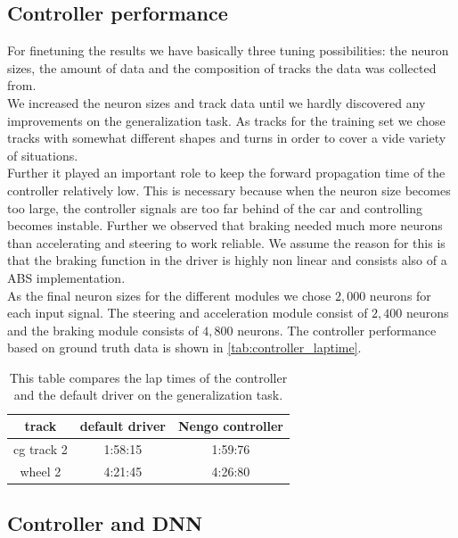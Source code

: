 \documentclass[10pt,a4paper,twoside,journal]{IEEEtran}
\begin{document}
\subsection{Controller performance}
For finetuning the results we have basically three tuning possibilities: the neuron sizes, the amount of data and the composition of tracks the data was collected from. \\
We increased the neuron sizes and track data until we hardly discovered any improvements on the generalization task. As tracks for the training set we chose tracks with somewhat different shapes and turns in order to cover a vide variety of situations. \\
Further it played an important role to keep the forward propagation time of the controller relatively low. This is necessary because when the neuron size becomes too large, the controller signals are too far behind of the car and controlling becomes instable. Further we observed that braking needed much more neurons than accelerating and steering to work reliable. We assume the reason for this is that the braking function in the driver is highly non linear and consists also of a ABS implementation. \\
As the final neuron sizes for the different modules we chose $2,000$ neurons for each input signal. The steering and acceleration module consist of $2,400$ neurons and the braking module consists of $4,800$ neurons. The controller performance based on ground truth data is shown in \autoref{tab:controller_laptime}.

\begin{table}[ht]
	\begin{center}
		\begin{tabular}{ |c|c|c| } 
			\hline
			track &  default driver & Nengo controller\\
			\hline
			cg track 2  & 1:58:15 & 1:59:76  \\
			wheel 2 & 4:21:45 & 4:26:80 \\
			\hline
		\end{tabular}
		\caption{\label{tab:controller_laptime}This table compares the lap times of the controller and the default driver on the generalization task.}
	\end{center}
\end{table}


\subsection{Controller and DNN}
\end{document}
